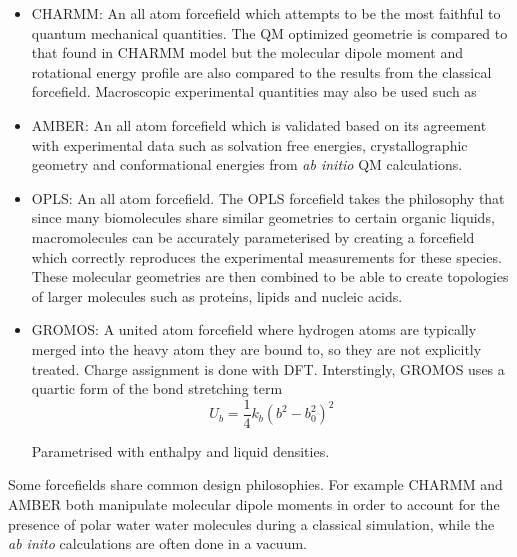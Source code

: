 \begin{itemize}
	\item CHARMM: An all atom forcefield which attempts to be the most faithful to quantum mechanical quantities. The QM optimized geometrie is compared to that found in CHARMM model but the molecular dipole moment and rotational energy profile are also compared to the results from the classical forcefield. Macroscopic experimental quantities may also be used such as 
	\item AMBER: An all atom forcefield which is validated based on its agreement with experimental data such as solvation free energies, crystallographic geometry and conformational energies from \textit{ab initio} QM calculations.
	\item OPLS: An all atom forcefield. The OPLS forcefield takes the philosophy that since many biomolecules share similar geometries to certain organic liquids, macromolecules can be accurately parameterised by creating a forcefield which correctly reproduces the experimental measurements for these species. These molecular geometries are then combined to be able to create topologies of larger molecules such as proteins, lipids and nucleic acids.
	\item GROMOS: A united atom forcefield where hydrogen atoms are typically merged into the heavy atom they are bound to, so they are not explicitly treated. Charge assignment is done with DFT. Interstingly, GROMOS uses a quartic form of the bond stretching term 
		\begin{equation}
			U_b = \frac{1}{4} k_b (b^2-b^2_0)^2
		\end{equation}

		Parametrised with enthalpy and liquid densities.

\end{itemize}
Some forcefields share common design philosophies. For example CHARMM and AMBER both manipulate molecular dipole moments in order to account for the presence of polar water water molecules during a classical simulation, while the \textit{ab inito} calculations are often done in a vacuum.


